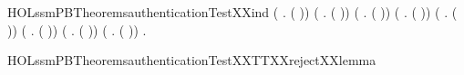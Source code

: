 \begin{SaveVerbatim}{HOLssmPBTheoremsauthenticationTestXXind}
     (\HOLSymConst{\HOLTokenForall{}}  .  (   )) \HOLSymConst{\HOLTokenConj{}}
     (\HOLSymConst{\HOLTokenForall{}} .  (  )) \HOLSymConst{\HOLTokenConj{}}
     (\HOLSymConst{\HOLTokenForall{}} .  (  )) \HOLSymConst{\HOLTokenConj{}}
     (\HOLSymConst{\HOLTokenForall{}} .  (  )) \HOLSymConst{\HOLTokenConj{}}
     (\HOLSymConst{\HOLTokenForall{}} .  (  )) \HOLSymConst{\HOLTokenConj{}} (\HOLSymConst{\HOLTokenForall{}} .  (  )) \HOLSymConst{\HOLTokenConj{}}
     (\HOLSymConst{\HOLTokenForall{}} .  (  )) \HOLSymConst{\HOLTokenConj{}} (\HOLSymConst{\HOLTokenForall{}} .  (  )) \HOLSymConst{\HOLTokenImp{}}
     \HOLSymConst{\HOLTokenForall{}}.  
\end{SaveVerbatim}
\newcommand{\HOLssmPBTheoremsauthenticationTestXXind}{\UseVerbatim{HOLssmPBTheoremsauthenticationTestXXind}}
\begin{SaveVerbatim}{HOLssmPBTheoremsauthenticationTestXXTTXXrejectXXlemma}
\HOLTokenTurnstile{} \HOLSymConst{\HOLTokenNeg{}} 
\end{SaveVerbatim}
\newcommand{\HOLssmPBTheoremsauthenticationTestXXTTXXrejectXXlemma}{\UseVerbatim{HOLssmPBTheoremsauthenticationTestXXTTXXrejectXXlemma}}
